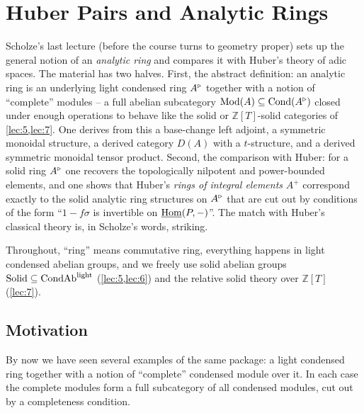 \section{Huber Pairs and Analytic Rings}
\label{lec:8}

Scholze's last lecture (before the course turns to geometry proper) sets up the
general notion of an \emph{analytic ring} and compares it with Huber's theory of
adic spaces. The material has two halves. First, the abstract definition: an
analytic ring is an underlying light condensed ring $A^{\triangleright}$ together with a
notion of ``complete'' modules -- a full abelian subcategory
$\operatorname{Mod}(A)\subseteq\operatorname{Cond}(A^{\triangleright})$ closed under enough operations to behave like the
solid or $\mathbb{Z}[T]$-solid categories of \cref{lec:5,lec:7}. One derives from
this a base-change left adjoint, a symmetric monoidal structure, a derived
category $D(A)$ with a $t$-structure, and a derived symmetric monoidal tensor
product. Second, the comparison with Huber: for a solid ring $A^{\triangleright}$ one recovers
the topologically nilpotent and power-bounded elements, and one shows that
Huber's \emph{rings of integral elements} $A^{+}$ correspond exactly to the solid
analytic ring structures on $A^{\triangleright}$ that are cut out by conditions of the form
``$1-f\sigma$ is invertible on $\underline{\operatorname{Hom}}(P,-)$''. The match with Huber's classical
theory is, in Scholze's words, striking.

Throughout, ``ring'' means commutative ring, everything happens in light
condensed abelian groups, and we freely use solid abelian groups
$\mathrm{Solid}\subseteq\mathrm{CondAb}^{\mathrm{light}}$ (\cref{lec:5,lec:6}) and the relative solid theory over
$\mathbb{Z}[T]$ (\cref{lec:7}).

\subsection{Motivation}

By now we have seen several examples of the same package: a light condensed ring
together with a notion of ``complete'' condensed module over it. In each case the
complete modules form a full subcategory of all condensed modules, cut out by a
completeness condition.

